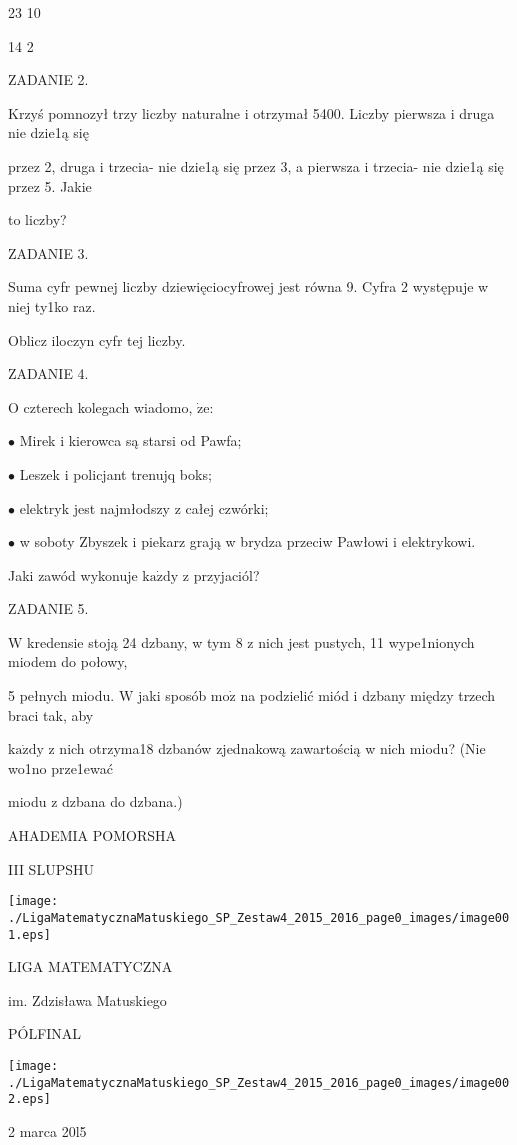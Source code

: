 \documentclass[a4paper,12pt]{article}
\begin{document}
23  10

14  2

ZADANIE 2.

Krzyś pomnozył trzy liczby naturalne i otrzymał 5400. Liczby pierwsza i druga nie dzie1ą się

przez 2, druga i trzecia- nie dzie1ą się przez 3, a pierwsza i trzecia- nie dzie1ą się przez 5. Jakie

to liczby?

ZADANIE 3.

Suma cyfr pewnej liczby dziewięciocyfrowej jest równa 9. Cyfra 2 występuje w niej ty1ko raz.

Oblicz iloczyn cyfr tej liczby.

ZADANIE 4.

$\mathrm{O}$ czterech kolegach wiadomo, $\dot{\mathrm{z}}\mathrm{e}$:

$\bullet$ Mirek i kierowca są starsi od Pawfa;

$\bullet$ Leszek i policjant trenujq boks;

$\bullet$ elektryk jest najmłodszy z całej czwórki;

$\bullet$ w soboty Zbyszek i piekarz grają w brydza przeciw Pawłowi i elektrykowi.

Jaki zawód wykonuje $\mathrm{k}\mathrm{a}\dot{\mathrm{z}}\mathrm{d}\mathrm{y}$ z przyjaciól?

ZADANIE 5.

$\mathrm{W}$ kredensie stoją 24 dzbany, w tym 8 z nich jest pustych, 11 wype1nionych miodem do połowy,

5 pełnych miodu. $\mathrm{W}$ jaki sposób $\mathrm{m}\mathrm{o}\dot{\mathrm{z}}$ na podzielić miód i dzbany między trzech braci tak, aby

$\mathrm{k}\mathrm{a}\dot{\mathrm{z}}\mathrm{d}\mathrm{y}$ z nich otrzyma18 dzbanów zjednakową zawartością w nich miodu? (Nie wo1no prze1ewać

miodu z dzbana do dzbana.)






AHADEMIA POMORSHA

III SLUPSHU
\begin{center}
\texttt{[image: ./LigaMatematycznaMatuskiego\_SP\_Zestaw4\_2015\_2016\_page0\_images/image001.eps]}
\end{center}
LIGA MATEMATYCZNA

im. Zdzisława Matuskiego

PÓLFINAL
\begin{center}
\texttt{[image: ./LigaMatematycznaMatuskiego\_SP\_Zestaw4\_2015\_2016\_page0\_images/image002.eps]}
\end{center}
2 marca 20l5
\end{document}
